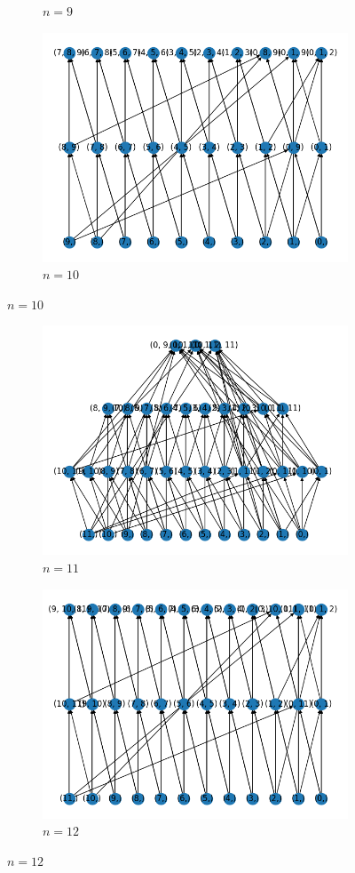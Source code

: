 \begin{figure}[h]
\begin{subfigure}{.5\textwidth}
        \caption{$ n = 9 $}
      \end{subfigure}%
      \begin{subfigure}{.5\textwidth}
        \centering
        \includegraphics[width=.8\linewidth]{imagenes/10.png}
        \caption{$ n = 10 $}
      \end{subfigure}
\end{figure}
\begin{figure}[h]
     \begin{subfigure}{.5\textwidth}
        \centering
        \includegraphics[width=.8\linewidth]{imagenes/11.png}
        \caption{$ n = 11 $}
      \end{subfigure}%
      \begin{subfigure}{.5\textwidth}
        \centering
        \includegraphics[width=.8\linewidth]{imagenes/12.png}
        \caption{$ n = 12 $}
      \end{subfigure}
\end{figure}
